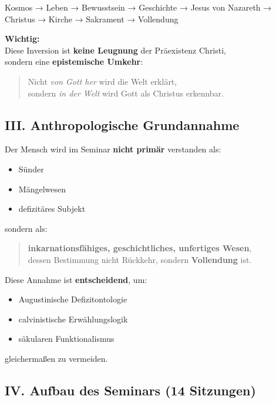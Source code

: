 \documentclass[
]{article}
\begin{document}
Kosmos → Leben → Bewusstsein → Geschichte → Jesus von Nazareth → Christus → Kirche → Sakrament → Vollendung

\textbf{Wichtig:\\
}Diese Inversion ist \textbf{keine Leugnung} der Präexistenz Christi,\\
sondern eine \textbf{epistemische Umkehr}:

\begin{quote}
Nicht \emph{von Gott her} wird die Welt erklärt,\\
sondern \emph{in der Welt} wird Gott als Christus erkennbar.
\end{quote}

\subsection{\texorpdfstring{\textbf{III. Anthropologische Grundannahme}}{III. Anthropologische Grundannahme}}\label{iii.-anthropologische-grundannahme}

Der Mensch wird im Seminar \textbf{nicht primär} verstanden als:

\begin{itemize}
\item
  Sünder
\item
  Mängelwesen
\item
  defizitäres Subjekt
\end{itemize}

sondern als:

\begin{quote}
\textbf{inkarnationsfähiges, geschichtliches, unfertiges Wesen},\\
dessen Bestimmung nicht Rückkehr, sondern \textbf{Vollendung} ist.
\end{quote}

Diese Annahme ist \textbf{entscheidend}, um:

\begin{itemize}
\item
  Augustinische Defizitontologie
\item
  calvinistische Erwählungslogik
\item
  säkularen Funktionalismus
\end{itemize}

gleichermaßen zu vermeiden.

\subsection{\texorpdfstring{\textbf{IV. Aufbau des Seminars (14 Sitzungen)}}{IV. Aufbau des Seminars (14 Sitzungen)}}\label{iv.-aufbau-des-seminars-14-sitzungen}
\end{document}
